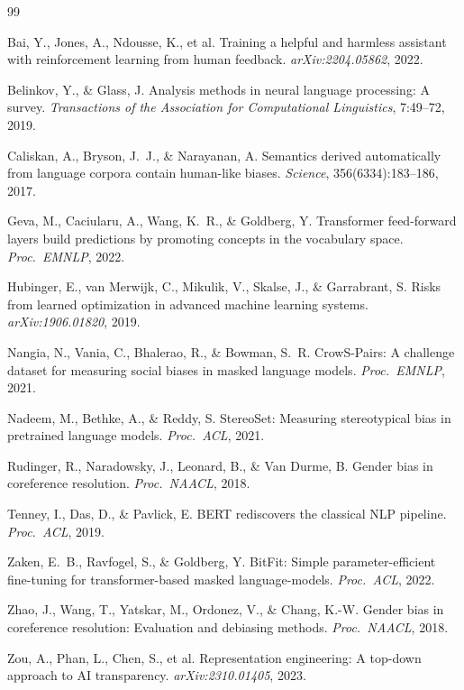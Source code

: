 \documentclass[11pt,a4paper]{article}
\begin{document}

\begin{thebibliography}{99}

Bai, Y., Jones, A., Ndousse, K., et al.
\newblock Training a helpful and harmless assistant with reinforcement learning from human feedback.
\newblock \emph{arXiv:2204.05862}, 2022.

Belinkov, Y., \& Glass, J.
\newblock Analysis methods in neural language processing: A survey.
\newblock \emph{Transactions of the Association for Computational Linguistics}, 7:49--72, 2019.

Caliskan, A., Bryson, J.~J., \& Narayanan, A.
\newblock Semantics derived automatically from language corpora contain human-like biases.
\newblock \emph{Science}, 356(6334):183--186, 2017.

Geva, M., Caciularu, A., Wang, K.~R., \& Goldberg, Y.
\newblock Transformer feed-forward layers build predictions by promoting concepts in the vocabulary space.
\newblock \emph{Proc.\ EMNLP}, 2022.

Hubinger, E., van Merwijk, C., Mikulik, V., Skalse, J., \& Garrabrant, S.
\newblock Risks from learned optimization in advanced machine learning systems.
\newblock \emph{arXiv:1906.01820}, 2019.

Nangia, N., Vania, C., Bhalerao, R., \& Bowman, S.~R.
\newblock CrowS-Pairs: A challenge dataset for measuring social biases in masked language models.
\newblock \emph{Proc.\ EMNLP}, 2021.

Nadeem, M., Bethke, A., \& Reddy, S.
\newblock StereoSet: Measuring stereotypical bias in pretrained language models.
\newblock \emph{Proc.\ ACL}, 2021.

Rudinger, R., Naradowsky, J., Leonard, B., \& Van Durme, B.
\newblock Gender bias in coreference resolution.
\newblock \emph{Proc.\ NAACL}, 2018.

Tenney, I., Das, D., \& Pavlick, E.
\newblock BERT rediscovers the classical NLP pipeline.
\newblock \emph{Proc.\ ACL}, 2019.

Zaken, E.~B., Ravfogel, S., \& Goldberg, Y.
\newblock BitFit: Simple parameter-efficient fine-tuning for transformer-based masked language-models.
\newblock \emph{Proc.\ ACL}, 2022.

Zhao, J., Wang, T., Yatskar, M., Ordonez, V., \& Chang, K.-W.
\newblock Gender bias in coreference resolution: Evaluation and debiasing methods.
\newblock \emph{Proc.\ NAACL}, 2018.

Zou, A., Phan, L., Chen, S., et al.
\newblock Representation engineering: A top-down approach to AI transparency.
\newblock \emph{arXiv:2310.01405}, 2023.

\end{thebibliography}
\end{document}
